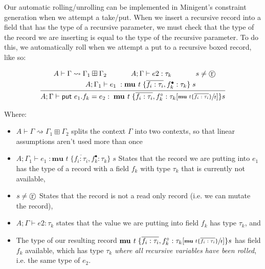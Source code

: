 Our automatic rolling/unrolling can be implemented in Minigent's constraint generation when we attempt a \textsf{take}/\textsf{put}.
When we insert a recursive record into a field that has the type of a recursive parameter, we must check that the type of the record
we are inserting is equal to the type of the recursive parameter. To do this, we automatically roll
when we attempt a \textsf{put} to a recursive boxed record, like so: 

\begin{align*}
    \infer{
        A;\Gamma \vdash \textsf{put } e_1.f_k  = e_2 : \; \textbf{mu } t\; \{ \overline{f_i : \tau_i}, f_k^\circ : \tau_k[\sfrac{ \textbf{mu } t \{\overline{f_i : \tau_i} \}}{t}] \} s
    }{
        \begin{array}{c@{}c@{}c@{}c@{}}
            A \vdash \Gamma \rightsquigarrow \Gamma_1 \boxplus \Gamma_2 \hspace{2em}
            &
            A;\Gamma \vdash e2 : \tau_k \hspace{2em}
            &
            s \neq \text{\textcircled{r}}   \vspace{0.25em} \\
            &
            \hspace{-5em}A;\Gamma_1 \vdash e_1\; : \textbf{mu } t\; \{ \overline{f_i : \tau_i}, f_k^\bullet : \tau_k \}\; s 
        \end{array}
    }
\end{align*}

Where:
\begin{itemize}
    \item $A \vdash \Gamma \rightsquigarrow \Gamma_1 \boxplus \Gamma_2$ splits the context $\Gamma$ into two contexts, so that linear assumptions aren't used 
          more than once
    \item $A;\Gamma_1 \vdash e_1\; : \textbf{mu } t\; \{ \overline{f_i : \tau_i}, f_k^\bullet : \tau_k \}\; s$ States that the record we are putting into $e_1$
          has the type of a record with a field $f_k$ with type $\tau_k$ that is currently not available,
    \item $s \neq \text{\textcircled{r}}   \vspace{0.5em}$ States that the record is not a read only record (i.e. we can mutate the record),
    \item $A;\Gamma \vdash e2 : \tau_k$ states that
          the value we are putting into field $f_k$ has type $\tau_k$, and
    \item The type of our resulting record $\textbf{mu } t\; \{ \overline{f_i : \tau_i}, f_k^\circ : \tau_k[\sfrac{ \textbf{mu } t \{\overline{f_i : \tau_i} \}}{t}] \} s$
          has field $f_k$ available, which has type $\tau_k$ \textit{where all recursive variables have been rolled}, i.e. the same type of $e_2$.
\end{itemize}

